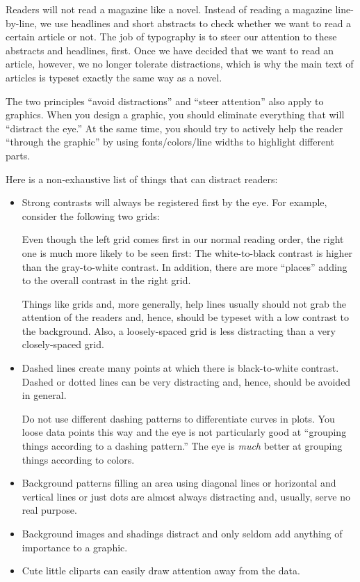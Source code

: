 Readers will not read a magazine like a novel. Instead of reading a
magazine line-by-line, we use headlines and short abstracts to check
whether we want to read a certain article or not. The job of
typography is to steer our attention to these abstracts and headlines,
first. Once we have decided that we want to read an article, however,
we no longer tolerate distractions, which is why the main text of
articles is typeset exactly the same way as a novel.

The two principles ``avoid distractions'' and ``steer attention'' also
apply to graphics. When you design a graphic, you should eliminate
everything that will ``distract the eye.'' At the same time, you
should try to actively help the reader ``through the graphic'' by
using fonts/colors/line widths to highlight different parts.

Here is a non-exhaustive list of things that can distract readers:
\begin{itemize}
\item
  Strong contrasts will always be registered first by the eye. For
  example, consider the following two grids:

  \medskip\par

  \medskip
  Even though the left grid comes first in our normal reading order,
  the right one is much more likely to be seen first: The
  white-to-black contrast is higher than the gray-to-white
  contrast. In addition, there are more ``places'' adding to the
  overall contrast in the right grid.

  Things like grids and, more generally, help lines usually should not
  grab the attention of the readers and, hence, should be typeset with
  a low contrast to the background. Also, a loosely-spaced grid is
  less distracting than a very closely-spaced grid.
\item
  Dashed lines create many points at which there is black-to-white
  contrast. Dashed or dotted lines can be very distracting and, hence,
  should be avoided in general.

  Do not use different dashing patterns to differentiate curves in
  plots. You loose data points this way and the eye is not
  particularly good at ``grouping things according to a dashing
  pattern.'' The eye is \emph{much} better at grouping things
  according to colors.
\item
  Background patterns filling an area using  diagonal lines or
  horizontal and vertical lines or just dots are almost always
  distracting and, usually, serve no real purpose.
\item
  Background images and shadings distract and only seldom add
  anything of importance to a graphic.
\item
  Cute little cliparts can easily draw attention away from the
  data.
\end{itemize}

